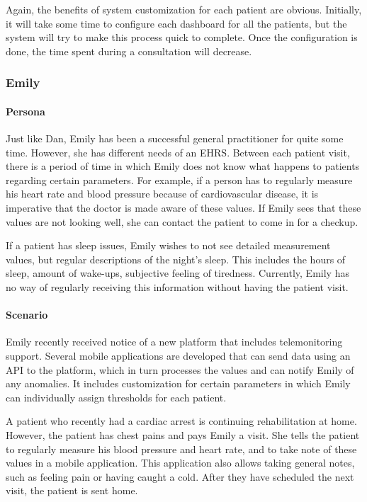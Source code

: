         \noindent Again, the benefits of system customization for each patient are obvious. Initially, it will take some time to configure each dashboard for all the patients, but the system will try to make this process quick to complete. Once the configuration is done, the time spent during a consultation will decrease.
        
        \subsubsection{Emily}

        \paragraph{Persona} Just like Dan, Emily has been a successful general practitioner for quite some time. However, she has different needs of an EHRS. Between each patient visit, there is a period of time in which Emily does not know what happens to patients regarding certain parameters. For example, if a person has to regularly measure his heart rate and blood pressure because of cardiovascular disease, it is imperative that the doctor is made aware of these values. If Emily sees that these values are not looking well, she can contact the patient to come in for a checkup.

        If a patient has sleep issues, Emily wishes to not see detailed measurement values, but regular descriptions of the night’s sleep. This includes the hours of sleep, amount of wake-ups, subjective feeling of tiredness. Currently, Emily has no way of regularly receiving this information without having the patient visit.
        
        \paragraph{Scenario} Emily recently received notice of a new platform that includes telemonitoring support. Several mobile applications are developed that can send data using an API to the platform, which in turn processes the values and can notify Emily of any anomalies. It includes customization for certain parameters in which Emily can individually assign thresholds for each patient.

        A patient who recently had a cardiac arrest is continuing rehabilitation at home. However, the patient has chest pains and pays Emily a visit. She tells the patient to regularly measure his blood pressure and heart rate, and to take note of these values in a mobile application. This application also allows taking general notes, such as feeling pain or having caught a cold. After they have scheduled the next visit, the patient is sent home.
        
